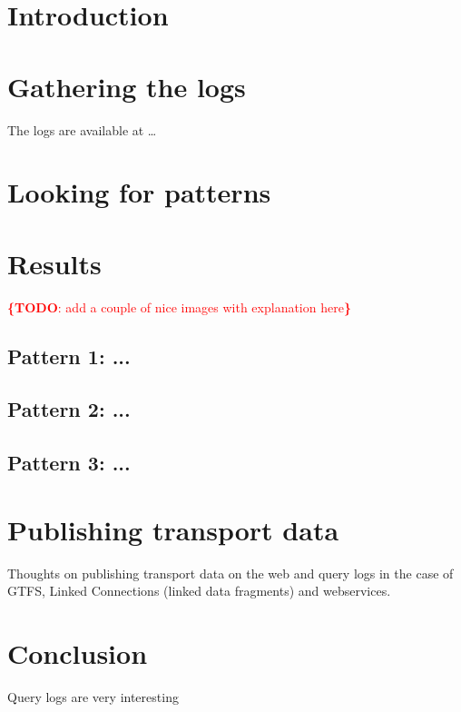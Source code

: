\documentclass{sig-alternate}
\newcommand{\todo}[1]{\noindent\textcolor{red}{{\bf \{TODO}: #1{\bf \}}}}
\begin{document}
\vspace{1em}

\section{Introduction}
\label{sec:introduction}


\section{Gathering the logs}
\label{sec:logs}

The logs are available at \ldots

\section{Looking for patterns}
\label{sec:method}


\section{Results}
\label{sec:results}

\todo{add a couple of nice images with explanation here}

\subsection{Pattern 1: ...}
\label{sec:pattern1}


\subsection{Pattern 2: ...}
\label{sec:pattern2}

\subsection{Pattern 3: ...}
\label{sec:pattern3}

\section{Publishing transport data}

Thoughts on publishing transport data on the web and query logs in the case of GTFS, Linked Connections\cite{lc} (linked data fragments\cite{ldf}) and webservices.

\section{Conclusion}
\label{sec:conclusion}

Query logs are very interesting

\let\oldsection\section
\renewcommand{\section}[2][1]{\oldsection{#1}\vspace{-3pt}}



\end{document}

